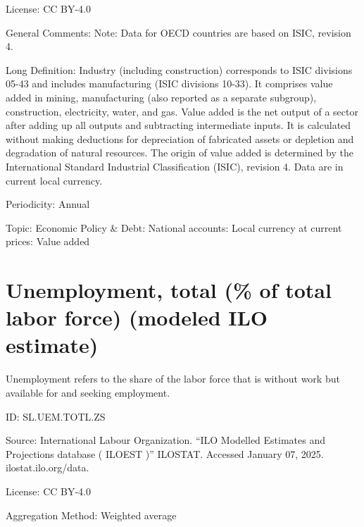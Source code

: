 \documentclass[a4paper]{article}
\begin{document}
License:  CC BY-4.0 

General Comments: Note: Data for OECD countries are based on ISIC, revision 4.

Long Definition: Industry (including construction) corresponds to ISIC divisions 05-43 and includes manufacturing (ISIC divisions 10-33). It comprises value added in mining, manufacturing (also reported as a separate subgroup), construction, electricity, water, and gas. Value added is the net output of a sector after adding up all outputs and subtracting intermediate inputs. It is calculated without making deductions for depreciation of fabricated assets or depletion and degradation of natural resources. The origin of value added is determined by the International Standard Industrial Classification (ISIC), revision 4. Data are in current local currency.

Periodicity: Annual

Topic: Economic Policy \& Debt: National accounts: Local currency at current prices: Value added

\section{Unemployment, total (\% of total labor force) (modeled ILO estimate)}

Unemployment refers to the share of the labor force that is without work but available for and seeking employment.

ID: SL.UEM.TOTL.ZS

Source: International Labour Organization. “ILO Modelled Estimates and Projections database ( ILOEST )” ILOSTAT. Accessed January 07, 2025. ilostat.ilo.org/data.

License:  CC BY-4.0 

Aggregation Method: Weighted average
\end{document}

